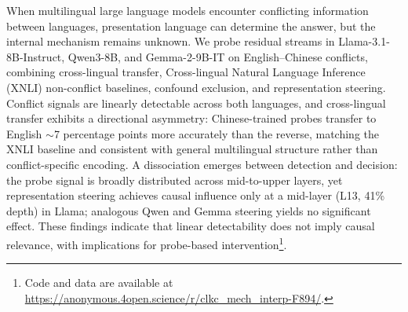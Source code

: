 When multilingual large language models encounter conflicting information between languages, presentation language can determine the answer, but the internal mechanism remains unknown. We probe residual streams in Llama-3.1-8B-Instruct, Qwen3-8B, and Gemma-2-9B-IT on English--Chinese conflicts, combining cross-lingual transfer, Cross-lingual Natural Language Inference (XNLI) non-conflict baselines, confound exclusion, and representation steering. Conflict signals are linearly detectable across both languages, and cross-lingual transfer exhibits a directional asymmetry: Chinese-trained probes transfer to English ${\sim}$7 percentage points more accurately than the reverse, matching the XNLI baseline and consistent with general multilingual structure rather than conflict-specific encoding. A dissociation emerges between detection and decision: the probe signal is broadly distributed across mid-to-upper layers, yet representation steering achieves causal influence only at a mid-layer (L13, 41\% depth) in Llama; analogous Qwen and Gemma steering yields no significant effect. These findings indicate that linear detectability does not imply causal relevance, with implications for probe-based intervention\footnote{Code and data are available at \url{https://anonymous.4open.science/r/clkc_mech_interp-F894/}.}.
